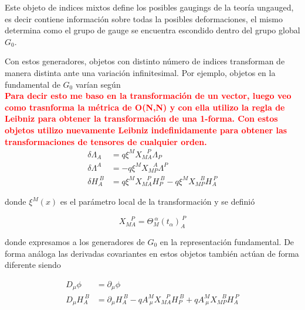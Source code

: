 \documentclass{article}
\numberwithin{equation}{section}
\begin{document}
Este objeto de indices mixtos define los posibles gaugings de la teoría ungauged, es decir contiene información sobre todas la posibles deformaciones, el mismo determina como el grupo de gauge se encuentra escondido dentro del grupo global $ G_0 $.

Con estos generadores, objetos con distinto número de indices transforman de manera distinta ante una variación infinitesimal. Por ejemplo, objetos en la fundamental de $ G_0 $ varían según\\

\textcolor{red}{\textbf{Para decir esto me baso en la transformación de un vector, luego veo como trasnforma la métrica de O(N,N) y con ella utilizo la regla de Leibniz para obtener la transformación de una 1-forma. Con estos objetos utilizo nuevamente Leibniz indefinidamente para obtener las transformaciones de tensores de cualquier orden.}}\\


\begin{equation}\label{deltaindices}
\begin{aligned}
\delta \Lambda_A &= q \xi^M X_{M A}^{\ \ \ \ P} \Lambda_P\\
\delta \Lambda^A &= -q \xi^M X_{M P}^{\ \ \ \ A} \Lambda^P\\
\delta H_A^{\ B} &= q \xi^M X_{M A}^{\ \ \ \ P} H_P^{\ B} -q \xi^M X_{M P}^{\ \ \ \ B} H_A^{\ P}
\end{aligned}
\end{equation}

donde $ \xi^M (x)  $ es el parámetro local de la transformación y se definió 

\begin{equation}
X_{M A}^{\ \ \ \ P} = \Theta_M^{\ \alpha} \left(t_{\alpha}\right)_A^{\ P}
\end{equation}

donde expresamos a los generadores de $ G_0 $ en la representación fundamental. De forma análoga las derivadas covariantes en estos objetos también actúan de forma diferente siendo

\begin{equation}\label{Dindices}
\begin{aligned}
D_{\mu} \phi &= \partial_{\mu} \phi\\
D_{\mu} H_A^{\ B} &= \partial_{\mu} H_A^{\ B} -q A^M_{\ \mu} X_{M A}^{\ \ \ \ P} H_P^{\ B} + q A^M_{\ \mu} X_{M P}^{\ \ \ \ B} H_A^{\ P}
\end{aligned}
\end{equation}
\end{document}
